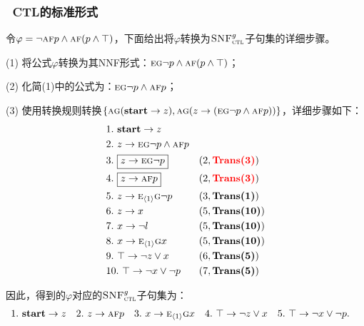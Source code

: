 \documentclass[aspectratio=1610, 9pt, CJK]{beamer}
\begin{document}
\begin{frame}
	\frametitle{~CTL的标准形式}
	\begin{example}\label{examp:Tran}
		\tiny
		令$\varphi=\neg \textsc{a} \textsc{f} p \wedge \textsc{a}\textsc{f}(p \wedge \top)$，下面给出将$\varphi$转换为${\textsc{SNF}_{\textsc{ctl}}^g}$子句集的详细步骤。
		
		(1) 将公式$\varphi$转换为其NNF形式：$\textsc{e}\textsc{g} \neg p \wedge \textsc{a}\textsc{f}(p \wedge \top)$；
		
		(2) 化简(1)中的公式为：$\textsc{e}\textsc{g} \neg p \wedge \textsc{a}\textsc{f} p$；
		
		(3) 使用转换规则转换$\{\textsc{a}\textsc{g}(\textbf{start} \rightarrow z), \textsc{a}\textsc{g}(z \rightarrow (\textsc{e}\textsc{g} \neg p \wedge \textsc{a}\textsc{f} p))\}$，详细步骤如下：
		\begin{align*}
			&1.\ \textbf{start} \rightarrow z && \\
			&2.\ z \rightarrow \textsc{e}\textsc{g} \neg p \wedge \textsc{a}\textsc{f} p &&  \\
			& 3.\ \boxed{z \rightarrow  \textsc{e}\textsc{g} \neg p} && (2, \textcolor{red}{\textbf{Trans(3)}})\\
			&4.\ \boxed{z \rightarrow \textsc{a}\textsc{f} p} && (2, \textcolor{red}{\textbf{Trans(3)}})\\
			&5.\ z \rightarrow  \textsc{e}_{{\langle{1}\rangle}}\textsc{g} \neg p  && (3, \textbf{Trans(1)})\\
			&6.\ z \rightarrow x && (5, \textbf{Trans(10)})\\
			&7.\ x\rightarrow \neg l && (5, \textbf{Trans(10)})\\
			&8.\ x\rightarrow \textsc{e}_{{\langle{1}\rangle}} \textsc{g} x&& (5, \textbf{Trans(10)})\\
			&9.\ \top \rightarrow \neg z \vee x && (6, \textbf{Trans(5)}) \\
			&10.\ \top \rightarrow \neg x \vee \neg p && (7, \textbf{Trans(5)}) 
		\end{align*}
		
		因此，得到的$\varphi$对应的${\textsc{SNF}_{\textsc{ctl}}^g}$子句集为：
		\begin{align*}
			&1.\ \textbf{start} \rightarrow z && 2.\ z \rightarrow \textsc{a}\textsc{f} p && 3.\ x\rightarrow \textsc{e}_{{\langle{1}\rangle}} \textsc{g} x
			&& 4.\ \top \rightarrow \neg z \vee x && 5.\ \top \rightarrow \neg x \vee \neg p.
		\end{align*}
	\end{example}
\end{frame}
\end{document}
